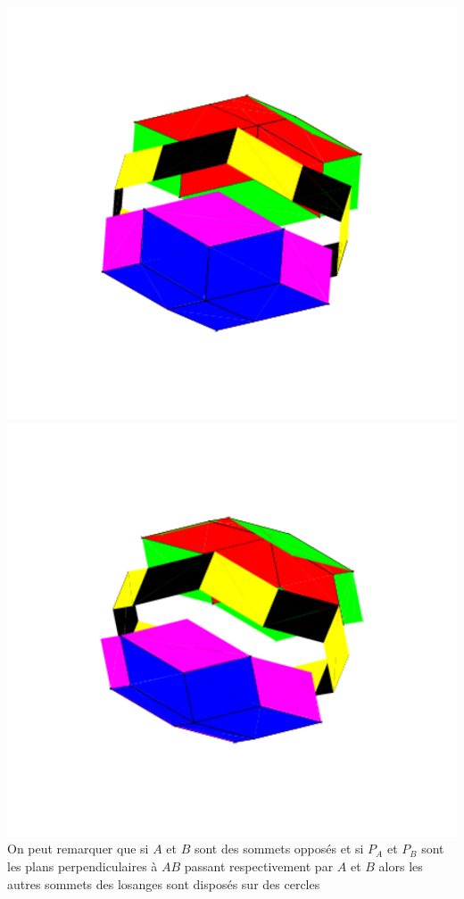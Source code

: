 \documentclass[a4paper,11pt]{book}
\begin{document}
\includegraphics[width=\textwidth]{triacon7}\\
\includegraphics[width=\textwidth]{triacon8}\\
On peut remarquer que si $A$ et $B$ sont des sommets oppos\'es et si $P_A$ et
 $P_B$ sont les plans perpendiculaires \`a $AB$ passant respectivement par $A$ 
et $B$ alors les autres sommets des losanges sont dispos\'es sur des cercles 
\end{document}
